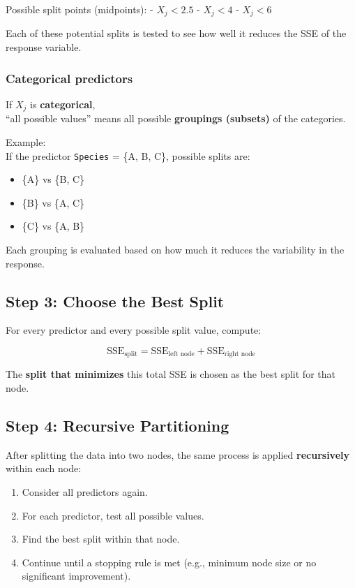 \documentclass[
  letterpaper,
  DIV=11,
  numbers=noendperiod]{scrreprt}
\providecommand{\tightlist}{%
  \setlength{\itemsep}{0pt}\setlength{\parskip}{0pt}}\usepackage{longtable,booktabs,array}
\begin{document}
Possible split points (midpoints): - \(X_j < 2.5\) - \(X_j < 4\) -
\(X_j < 6\)

Each of these potential splits is tested to see how well it reduces the
SSE of the response variable.

\subsubsection{Categorical predictors}\label{categorical-predictors}

If \(X_j\) is \textbf{categorical},\\
``all possible values'' means all possible \textbf{groupings (subsets)}
of the categories.

Example:\\
If the predictor \texttt{Species} = \{A, B, C\}, possible splits are:

\begin{itemize}
\item
  \{A\} vs \{B, C\}
\item
  \{B\} vs \{A, C\}
\item
  \{C\} vs \{A, B\}
\end{itemize}

Each grouping is evaluated based on how much it reduces the variability
in the response.

\subsection{Step 3: Choose the Best
Split}\label{step-3-choose-the-best-split}

For every predictor and every possible split value, compute:

\[
\text{SSE}_{\text{split}} = \text{SSE}_{\text{left node}} + \text{SSE}_{\text{right node}}
\]

The \textbf{split that minimizes} this total SSE is chosen as the best
split for that node.

\subsection{Step 4: Recursive
Partitioning}\label{step-4-recursive-partitioning}

After splitting the data into two nodes, the same process is applied
\textbf{recursively} within each node:

\begin{enumerate}
\def\labelenumi{\arabic{enumi}.}
\tightlist
\item
  Consider all predictors again.\\
\item
  For each predictor, test all possible values.\\
\item
  Find the best split within that node.\\
\item
  Continue until a stopping rule is met (e.g., minimum node size or no
  significant improvement).
\end{enumerate}
\end{document}
